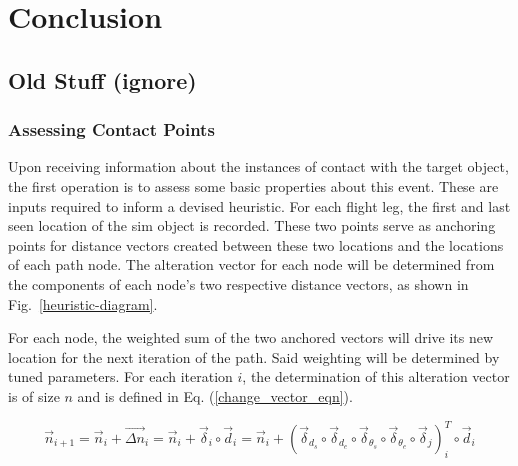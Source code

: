\documentclass[conf]{new-aiaa}
\begin{document}

\section{Conclusion}













\iffalse


\subsection{Old Stuff (ignore)}
\subsubsection{Assessing Contact Points}
Upon receiving information about the instances of contact with the target object, the first operation is to assess some basic properties about this event. These are inputs required to inform a devised heuristic. For each flight leg, the first and last seen location of the sim object is recorded. These two points serve as anchoring points for distance vectors created between these two locations and the locations of each path node. The alteration vector for each node will be determined from the components of each node's two respective distance vectors, as shown in Fig.~\ref{heuristic-diagram}.


For each node, the weighted sum of the two anchored vectors will drive its new location for the next iteration of the path. Said weighting will be determined by tuned parameters. For each iteration $i$, the determination of this alteration vector is of size $n$ and is defined in Eq. (\ref{change_vector_eqn}).

\begin{equation}
\label{change_vector_eqn}
\vec{n}_{i + 1} = \vec{n}_i + \vec{{\Delta}{n}}_i = \vec{n}_i + {\vec{\delta}}_i\circ{\vec{d}}_i = \vec{n}_i + \left({\vec{\delta}_{d_s}}\circ{\vec{\delta}_{d_e}}\circ{\vec{\delta}_{\theta_s}}\circ{\vec{\delta}_{\theta_e}}\circ{\vec{\delta}_j}\right)_i^T\circ{\vec{d}}_i
\end{equation}
\end{document}

